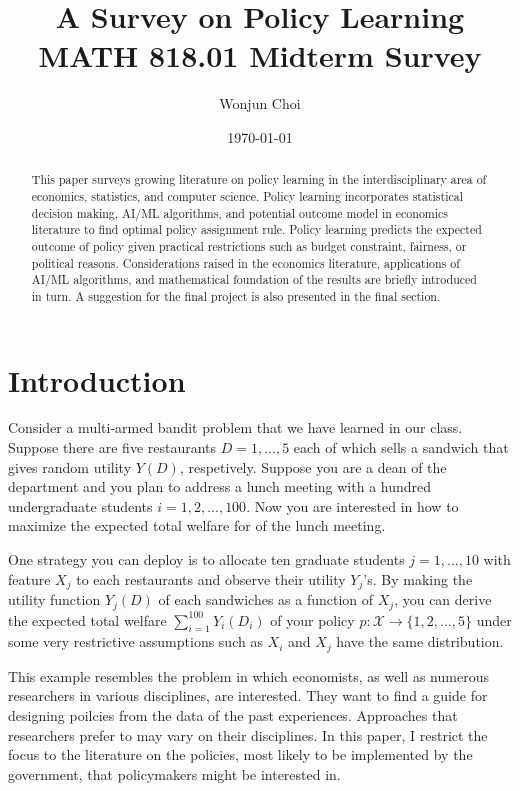 \documentclass[11pt]{article}
\title{A Survey on Policy Learning\\
	\large MATH 818.01 Midterm Survey
}
\author{Wonjun Choi}
\date{\today}
\begin{document}
	
	\maketitle
	
	\begin{abstract}
This paper surveys growing literature on policy learning in the interdisciplinary area of economics, statistics, and computer science. Policy learning incorporates statistical decision making, AI/ML algorithms, and potential outcome model in economics literature to find optimal policy assignment rule. Policy learning predicts the expected outcome of policy given practical restrictions such as budget constraint, fairness, or political reasons. Considerations raised in the economics literature, applications of AI/ML algorithms, and mathematical foundation of the results are briefly introduced in turn. A suggestion for the final project is also presented in the final section.
	\end{abstract}
	
	\section{Introduction}\label{section-introduction}
	Consider a multi-armed bandit problem that we have learned in our class. Suppose there are five restaurants $D=1,...,5$ each of which sells a sandwich that gives random utility $Y(D)$, respetively. Suppose you are a dean of the department and you plan to address a lunch meeting with a hundred undergraduate students $i=1,2,...,100$. Now you are interested in how to maximize the expected total welfare for of the lunch meeting.
	
	One strategy you can deploy is to allocate ten graduate students $j=1,...,10$ with feature $X_j$ to each restaurants and observe their utility $Y_j$'s. By making the utility function $Y_j(D)$ of each sandwiches as a function of $X_j$, you can derive the expected total welfare $\sum_{i=1}^{100} Y_i(D_i)$ of your policy $p: \mathcal{X} \rightarrow \{1,2,...,5\}$ under some very restrictive assumptions such as $X_i$ and $X_j$ have the same distribution.
	
	This example resembles the problem in which economists, as well as numerous researchers in various disciplines, are interested. They want to find a guide for designing poilcies from the data of the past experiences. Approaches that researchers prefer to may vary on their disciplines. In this paper, I restrict the focus to the literature on the policies, most likely to be implemented by the government, that policymakers might be interested in.
	
\end{document}

